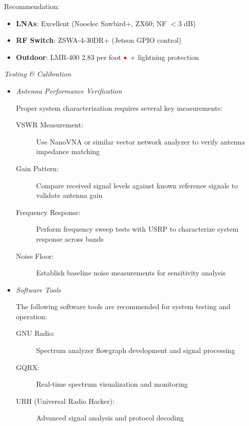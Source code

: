 \documentclass[11pt]{report}
\newcommand{\gc}[1]{\textcolor[rgb]{1.00,0.00,0.00}{#1}}
\newcommand{\blue}[1]{\textcolor[rgb]{0.00,0.00,1.00}{#1}}
\begin{document}
\begin{description}
\begin{enumerate}[label=\roman*)]
\gc{Recommendation}:
\begin{itemize}
	\item \textbf{LNAs}: Excellent (Nooelec Sawbird+, ZX60; NF $<$3 dB)
	\item \textbf{RF Switch}: ZSWA-4-30DR+ (Jetson GPIO control)
	\item \textbf{Outdoor}: LMR-400 \blue{2.83 per foot} \href{https://es.aliexpress.com/item/1005004600758847.html?src=google&albch=search&acnt=479-062-3723&isdl=y&aff_short_key=UneMJZVf&albcp=266121556&albag=7593673036&slnk=&trgt=dsa-42862830006&plac=&crea=426823514858&albad=426823514858&netw=g&device=c&mtctp=&memo1=&albbt=Google_7_search&aff_platform=google&albagn=888888&isSmbActive=false&isSmbAutoCall=false&needSmbHouyi=false&gad_source=1&gad_campaignid=266121556&gbraid=0AAAAAD2chG6RKc9qfZUj6zucgabpjois4&gclid=Cj0KCQiAp-zLBhDkARIsABcYc6voQ0VTv2_JGmsxvG-a9u2Q-eTM5Zb-DGj42dlZxQCljPpBkEjkGFkaAnT5EALw_wcB&gatewayAdapt=glo2esp}{$\gc{\bullet}$} + lightning protection 
\end{itemize}

\textit{Testing \& Calibration}

\begin{itemize} 
\item \textit{Antenna Performance Verification}

Proper system characterization requires several key measurements:

\begin{description}
	\item[VSWR Measurement:] Use NanoVNA or similar vector network analyzer to verify antenna impedance matching
	\item[Gain Pattern:] Compare received signal levels against known reference signals to validate antenna gain
	\item[Frequency Response:] Perform frequency sweep tests with USRP to characterize system response across bands
	\item[Noise Floor:] Establish baseline noise measurements for sensitivity analysis
\end{description}

\item \textit{Software Tools}

The following software tools are recommended for system testing and operation:

\begin{description}
	\item[GNU Radio:] Spectrum analyzer flowgraph development and signal processing
	\item[GQRX:] Real-time spectrum visualization and monitoring
	\item[URH (Universal Radio Hacker):] Advanced signal analysis and protocol decoding
\end{description}
\end{itemize}
\end{enumerate}


\end{description}
\end{document}
